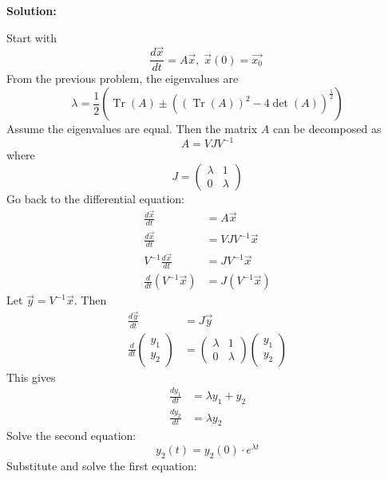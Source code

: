 \documentclass[12pt]{article}
\DeclareMathOperator{\Tr}{Tr}
\newenvironment{solution}{
    \textbf{Solution:}
    
}{
    
    \vspace{2em}
}
\begin{document}
\begin{solution}
    Start with
    \[
        \frac{d\vec{x}}{dt} = A\vec{x}, \; \vec{x}(0) = \vec{x_0} \;
    \]
    From the previous problem, the eigenvalues are
    \[
    \lambda = \frac{1}{2}\left(\Tr(A) \pm \left((\Tr(A))^2 - 4\det(A)\right)^{\frac{1}{2}}\right)
    \]
    Assume the eigenvalues are equal. Then the matrix \(A\) can be decomposed as
    \[
        A = VJV^{-1}
    \]
    where
    \[
        J = \begin{pmatrix}
            \lambda & 1 \\
            0 & \lambda
        \end{pmatrix}
    \]
    Go back to the differential equation:
    \[
        \begin{aligned}
            \frac{d\vec{x}}{dt} &= A\vec{x} \\
            \frac{d\vec{x}}{dt} &= VJV^{-1}\vec{x} \\
            V^{-1}\frac{d\vec{x}}{dt} &= JV^{-1}\vec{x} \\
            \frac{d}{dt}(V^{-1}\vec{x}) &= J (V^{-1}\vec{x})
        \end{aligned}
    \]
    Let \(\vec{y} = V^{-1}\vec{x}\). Then
    \[
        \begin{aligned}
            \frac{d\vec{y}}{dt} &= J\vec{y} \\
            \frac{d}{dt} \begin{pmatrix}
                y_1 \\
                y_2
            \end{pmatrix} &= \begin{pmatrix}
                \lambda & 1 \\
                0 & \lambda
            \end{pmatrix} \begin{pmatrix}
                y_1 \\
                y_2
            \end{pmatrix}
        \end{aligned}
    \]
    This gives
    \[
        \begin{aligned}
            \frac{dy_1}{dt} &= \lambda y_1 + y_2 \\
            \frac{dy_2}{dt} &= \lambda y_2
        \end{aligned}
    \]
    Solve the second equation:
    \[
        y_2(t) = y_2(0) \cdot e^{\lambda t}
    \]
    Substitute and solve the first equation:
    \[
        \begin{aligned}

\end{aligned}\]
\end{solution}
\end{document}
